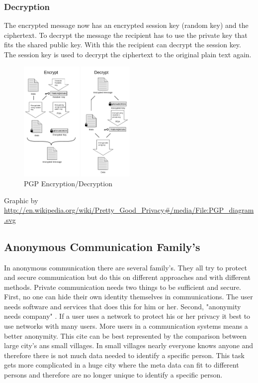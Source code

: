 \subsubsection{Decryption}
The encrypted message now has an encrypted session key (random key) and the ciphertext. To decrypt the message the recipient has to use the private key that fits the shared public key. With this the recipient can decrypt the session key. The session key is used to decrypt the ciphertext to the original plain text again. 

\begin{figure}[h!]
  \centering
      \includegraphics[width=0.5\textwidth]{images/pgp.png}
  \caption{PGP Encryption/Decryption} 
\end{figure}

Graphic by \url{http://en.wikipedia.org/wiki/Pretty_Good_Privacy#/media/File:PGP_diagram.svg}

  
\subsection{Anonymous Communication Family's} %
\label{sub:anonymous_communication_families}
In anonymous communication there are several family's. They all try to protect and secure communication but do this on different approaches and with different methods. Private communication needs two things to be sufficient and secure. First, no one can hide their own identity themselves in communications. The user needs software and services that does this for him or her. Second, "anonymity needs company" \cite{dingledine2006anonymity}. If a user uses a network to protect his or her privacy it best to use networks with many users. More users in a communication systems means a better anonymity. This cite can be best represented by the comparison between large city's ans small villages. In small villages nearly everyone knows anyone and therefore there is not much data needed to identify a specific person. This task gets more complicated in a huge city where the meta data can fit to different persons and therefore are no longer unique to identify a specific person.

